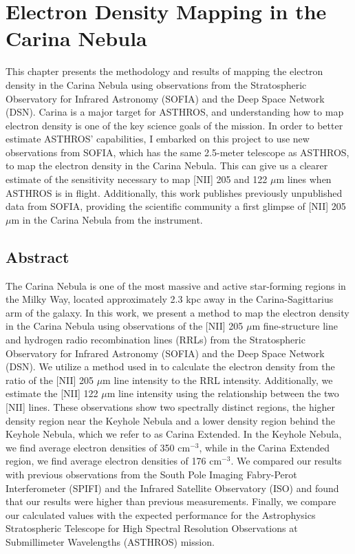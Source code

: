 \chapter[Electron Density Mapping in the Carina Nebula]{Electron Density Mapping in the Carina Nebula}
\label{ch:carina}
This chapter presents the methodology and results of mapping the electron density in the Carina Nebula using observations from the Stratospheric Observatory for Infrared Astronomy (SOFIA) and the Deep Space Network (DSN).
Carina is a major target for ASTHROS, and understanding how to map electron density is one of the key science goals of the mission.
In order to better estimate ASTHROS' capabilities, I embarked on this project to use new observations from SOFIA, which has the same 2.5-meter telescope as ASTHROS, to map the electron density in the Carina Nebula.
This can give us a clearer estimate of the sensitivity necessary to map [NII] 205 and 122 $\mu$m lines when ASTHROS is in flight. 
Additionally, this work publishes previously unpublished data from SOFIA, providing the scientific community a first glimpse of [NII] 205 $\mu$m in the Carina Nebula from the instrument. 

\section{Abstract}
The Carina Nebula is one of the most massive and active star-forming regions in the Milky Way, located approximately 2.3 kpc away in the Carina-Sagittarius arm of the galaxy.
In this work, we present a method to map the electron density in the Carina Nebula using observations of the [NII] 205 $\mu$m fine-structure line and hydrogen radio recombination lines (RRLs) from the Stratospheric Observatory for Infrared Astronomy (SOFIA) and the Deep Space Network (DSN).
We utilize a method used in \cite{pineda2019electron} to calculate the electron density from the ratio of the [NII] 205 $\mu$m line intensity to the RRL intensity.
Additionally, we estimate the [NII] 122 $\mu$m line intensity using the relationship between the two [NII] lines.
These observations show two spectrally distinct regions, the higher density region near the Keyhole Nebula and a lower density region behind the Keyhole Nebula, which we refer to as Carina Extended.
In the Keyhole Nebula, we find average electron densities of 350 cm$^{-3}$, while in the Carina Extended region, we find average electron densities of 176 cm$^{-3}$.
We compared our results with previous observations from the South Pole Imaging Fabry-Perot Interferometer (SPIFI) and the Infrared Satellite Observatory (ISO) and found that our results were higher than previous measurements.
Finally, we compare our calculated values with the expected performance for the Astrophysics Stratospheric Telescope for High Spectral Resolution Observations at Submillimeter Wavelengths (ASTHROS) mission.

